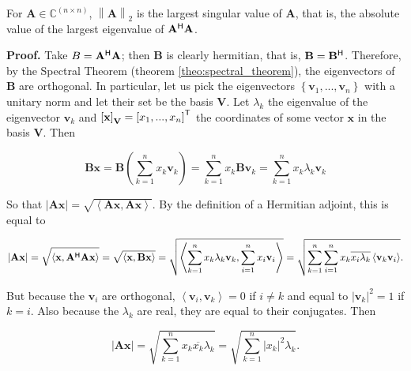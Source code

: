 \begin{theorem}\label{theo:spectral_norm} %
	For $\mathbf{A}\in\mathbb{C}^{(n\times n)}$, $\left\lVert\mathbf{A}\right\rVert_2$ is the largest singular value of $\mathbf{A}$, that is, the absolute value of the largest eigenvalue of $\mathbf{A^{\mathsf{H}}}\mathbf{A}$.
\end{theorem}
\noindent\textbf{Proof.} Take $B = \mathbf{A}^{\mathsf{H}}\mathbf{A}$; then $\mathbf{B}$ is clearly hermitian, that is, $\mathbf{B} = \mathbf{B}^{\mathsf{H}}$. Therefore, by the Spectral Theorem (theorem \ref{theo:spectral_theorem}), the eigenvectors of $\mathbf{B}$ are orthogonal. In particular, let us pick the eigenvectors $\left\{\mathbf{v}_1,...,\mathbf{v}_n\right\}$ with a unitary norm and let their set be the basis $\mathbf{V}$. Let $\lambda_k$ the eigenvalue of the eigenvector $\mathbf{v}_k$ and  $\left[\mathbf{x}\right]_\mathbf{V} = \left[x_1,...,x_n\right]^{\mathsf{T}}$ the coordinates of some vector $\mathbf{x}$ in the basis $\mathbf{V}$. Then

\begin{equation} \mathbf{Bx} = \mathbf{B}\left(\sum_{k=1}^n x_k\mathbf{v}_k\right) = \sum_{k=1}^n x_k\mathbf{Bv}_k = \sum_{k=1}^n x_k\lambda_k\mathbf{v}_k\end{equation}

	So that $\left\lvert \mathbf{Ax}\right\rvert = \sqrt{\left<\mathbf{Ax},\mathbf{Ax}\right>}$. By the definition of a Hermitian adjoint, this is equal to

\begin{equation} \left\lvert \mathbf{Ax}\right\rvert = \sqrt{\left<\mathbf{x},\mathbf{A}^{\mathsf{H}}\mathbf{Ax}\right>} = \sqrt{\left<\mathbf{x},\mathbf{Bx}\right>} = \sqrt{  \left< \sum_{k=1}^nx_k\lambda_k\mathbf{v}_k, \sum_{i=1}^n x_i \mathbf{v}_i\right>} = \sqrt{\sum_{k=1}^n \sum_{i=1}^n x_k\overline{x_i\lambda_k}\left<\mathbf{v}_k \mathbf{v}_i\right>} .\end{equation}

	But because the $\mathbf{v}_i$ are orthogonal, $\left<\mathbf{v}_i,\mathbf{v}_k\right> = 0$ if $i\neq k$ and equal to $\left\lvert \mathbf{v}_k\right\rvert^2 = 1$ if $k=i$. Also because the $\lambda_k$ are real, they are equal to their conjugates. Then

\begin{equation} \left\lvert \mathbf{Ax}\right\rvert = \sqrt{\sum_{k=1}^n x_k\overline{x_k}\lambda_k} = \sqrt{\sum_{k=1}^n \left\lvert x_k\right\rvert^2 \lambda_k} .\end{equation}

